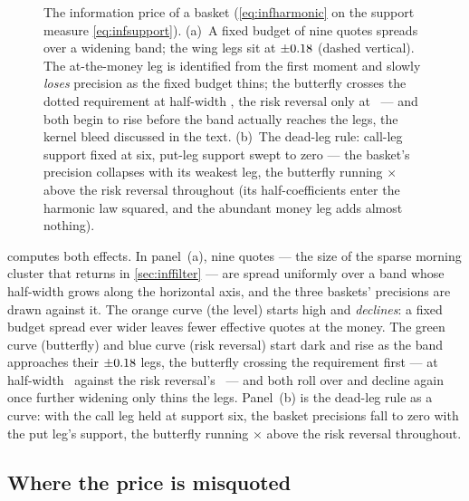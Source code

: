 \begin{figure}[htbp]
\centering
{}
\caption{The information price of a basket
(\cref{eq:infharmonic} on the support measure
\cref{eq:infsupport}).  (a)~A fixed budget of nine quotes spreads
over a widening band; the wing legs sit at
$\pm0.18$ (dashed vertical).  The at-the-money leg is
identified from the first moment and slowly \emph{loses} precision as
the fixed budget thins; the butterfly crosses the dotted requirement
at half-width \MacPriorBasketCrossBf, the risk reversal only at
\MacPriorBasketCrossRr\ --- and both begin to rise before the band
actually reaches the legs, the kernel bleed discussed in the text.
(b)~The dead-leg rule: call-leg support fixed at six, put-leg support
swept to zero --- the basket's precision collapses with its weakest
leg, the butterfly running \MacPriorBasketFactor$\times$ above the
risk reversal throughout (its half-coefficients enter the harmonic
law squared, and the abundant money leg adds almost nothing).}
\label{fig:infbasket}
\end{figure}

 computes both effects.  In panel~(a), nine
quotes --- the size of the sparse morning cluster that returns in
\cref{sec:inffilter} --- are spread uniformly over a band whose
half-width grows along the horizontal axis, and the three baskets'
precisions are drawn against it.  The orange curve (the level) starts
high and \emph{declines}: a fixed budget spread ever wider leaves
fewer effective quotes at the money.  The green curve (butterfly) and
blue curve (risk reversal) start dark and rise as the band approaches
their $\pm0.18$ legs, the butterfly crossing the
requirement first --- at half-width \MacPriorBasketCrossBf\ against
the risk reversal's \MacPriorBasketCrossRr\ --- and both roll over
and decline again once further widening only thins the legs.
Panel~(b) is the dead-leg rule as a curve: with the call leg held at
support six, the basket precisions fall to zero with the put leg's
support, the butterfly running \MacPriorBasketFactor$\times$ above
the risk reversal throughout.

\subsection{Where the price is misquoted}
\label{sec:infblind}

